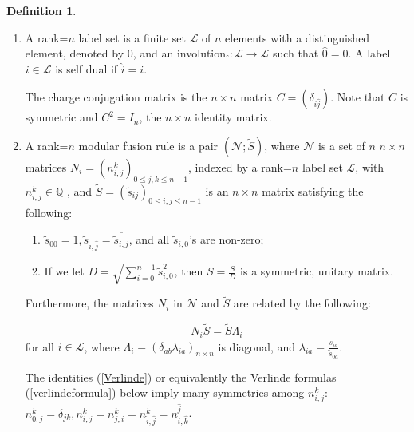 \documentclass[12pt,psamsfonts]{amsart}
\newcommand{\N}{\mathbb{N}}
\newcommand{\Q}{\mathbb Q}
\newcommand{\mL}{\mathcal{L}}
\newcommand{\mN}{\mathcal{N}}
\newcommand{\tS}{\tilde{S}}
\newcommand{\ts}{\tilde{s}}
\numberwithin{equation}{section}
\theoremstyle{definition}
\newtheorem{definition}[theorem]{Definition}
\begin{document}
\begin{definition}\label{fusionrule}

\begin{enumerate}

\item A rank=$n$ label set is a finite set $\mL$ of $n$ elements
with a distinguished element, denoted by $0$, and an involution
$\hat{}: \mL\rightarrow \mL$ such that $\hat{0}=0$.  A label $i\in
\mL$ is self dual if $\hat{i}=i$.

The charge conjugation matrix is the $n\times n$ matrix
$C=(\delta_{i\hat{j}})$.  Note that $C$ is symmetric and
$C^2=I_n$, the $n\times n$ identity matrix.

\item A rank=$n$ modular fusion rule is a pair $(\mN;\tS)$, where
$\mN$ is a set of $n$ $n\times n$ matrices $N_i=(n_{i,j}^k)_{0\leq
j, k\leq n-1} $, indexed by a rank=$n$ label set $\mL$, with
$n_{i,j}^k\in \Q$ , and $\tS=(\ts_{ij})_{0\leq i,j\leq n-1}$ is an
$n\times n$ matrix satisfying the following: 

\vspace{.1in}

\begin{enumerate}

\item $\ts_{00}=1, \ts_{i,\hat{j}}=\overline{\ts_{i,j}}$, and all
$\ts_{i,0}$'s are non-zero;

\item  If we let $D=\sqrt{\sum_{i=0}^{n-1}\tilde{s}_{i,0}^2}$,
then $S=\frac{\tS}{D}$ is a symmetric, unitary matrix.

\end{enumerate}

Furthermore, the matrices $N_i$ in $\mN$ and $\tS$ are related by
the following:

\begin{equation}\label{Verlinde}
N_i \tS=\tS \Lambda_i
\end{equation}
for all $i\in \mL$, where
$\Lambda_i=(\delta_{ab}\lambda_{ia})_{n\times n}$ is diagonal, and $\lambda_{ia}=\frac{\ts_{ia}}{\ts_{0a}}$.

The identities (\ref{Verlinde}) or equivalently the Verlinde
formulas (\ref{verlindeformula}) below imply many symmetries among
$n_{i,j}^k$: $n_{0,j}^k=\delta_{jk},
n_{i,j}^k=n_{j,i}^k=n_{\hat{i},\hat{j}}^{\hat{k}}=n_{i,\hat{k}}^{\hat{j}}$.


\end{enumerate}
\end{definition}
\end{document}
